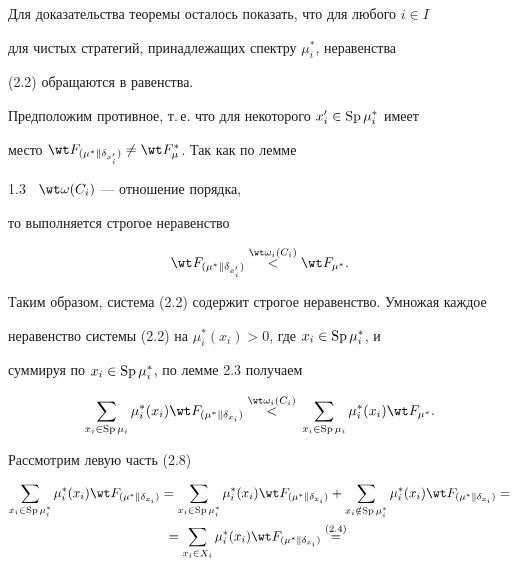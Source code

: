 \begin{pf}
Для доказательства теоремы осталось показать, что для любого $i\in I$ 


для чистых стратегий, принадлежащих спектру $\mu^*_i$, неравенства 


(2.2) обращаются в равенства. 


Предположим противное, т.\,е. что для некоторого $x'_i\in\operatorname{Sp}\mu^*_i$ имеет 


место $\wt F_{(\mu^*\|\delta_{x'_i})}\ne\wt F_\mu^*$. Так как по лемме 


1.3 \ $\wt\omega(C_i)$ --- отношение порядка, 


то выполняется строгое неравенство 


$$ 


\wt F_{(\mu^*\|\delta_{x'_i})}\up{\wt\omega_i(C_i)}{<}\wt F_{\mu^*}. 


$$ 


Таким образом, система (2.2) содержит строгое неравенство. Умножая каждое 


неравенство системы (2.2) на $\mu^*_i(x_i)>0$, где $x_i\in\operatorname{Sp}\mu^*_i$, и 


суммируя по $x_i\in\operatorname{Sp}\mu^*_i$, по лемме 2.3 получаем 


\begin{equation} 


\sum_{x_i\in\SP\mu_i}\mu^*_i(x_i) 


\wt F_{(\mu^*\|\delta_{x_i})}\up{\wt\omega_i(C_i)}{<} 


\sum_{x_i\in\SP\mu_i}\mu^*_i(x_i)\wt F_{\mu^*}. 


\end{equation} 


 


Рассмотрим левую часть (2.8) 


\begin{multline*} 


\sum_{x_i\in\SP\mu_i^*}\mu^*_i(x_i) 


\wt F_{(\mu^*\|\delta_{x_i})}=\sum_{x_i\in\SP\mu_i^*} 


\mu^*_i(x_i)\wt F_{(\mu^*\|\delta_{x_i})}+ 


\sum_{x_i\notin\SP\mu_i^*}\mu^*_i(x_i)


\wt F_{(\mu^*\|\delta_{x_i})}= \\ 


%


=\sum_{x_i\in X_i}


\mu^*_i(x_i)\wt F_{(\mu^*\|\delta_{x_i})}\up{(2.4)}{=} 



\end{multline*}
\end{pf}
